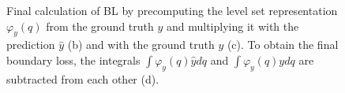 \begin{figure}[H]
    \caption[Final calculation of \ac{BL}]{Final calculation of \ac{BL} by precomputing the level set representation $\varphi_y(q)$ from the ground truth $y$ and multiplying it with the prediction $\hat{y}$ (b) and with the ground truth $y$ (c). To obtain the final boundary loss, the integrals $\int \varphi_y(q)\hat{y} dq$ and $\int \varphi_y(q)y dq$ are subtracted from each other (d).}
    \label{boundary_final}
\end{figure}

